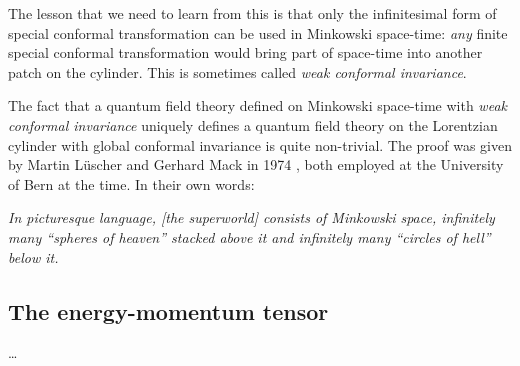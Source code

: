 \documentclass[a4paper,12pt]{article}
\numberwithin{equation}{section}
\begin{document}
The lesson that we need to learn from this is that only the infinitesimal form of special conformal transformation can be used in Minkowski space-time: \emph{any} finite special conformal transformation would bring part of space-time into another patch on the cylinder.
This is sometimes called \emph{weak conformal invariance}.

The fact that a quantum field theory defined on Minkowski space-time with \emph{weak conformal invariance} uniquely defines a quantum field theory on the Lorentzian cylinder with global conformal invariance is quite non-trivial. The proof was given by Martin Lüscher and Gerhard Mack in 1974 \cite{Luscher:1974ez}, both employed at the University of Bern at the time. In their own words:

\begin{center}

\parbox{11cm}{%
\emph{In picturesque language, [the superworld] consists of Minkowski space, infinitely many ``spheres of heaven'' stacked above it and infinitely many ``circles of hell'' below it.}}

\end{center}


\subsection{The energy-momentum tensor}

\ldots

%
%
%
%
%

\newpage


\end{document}
